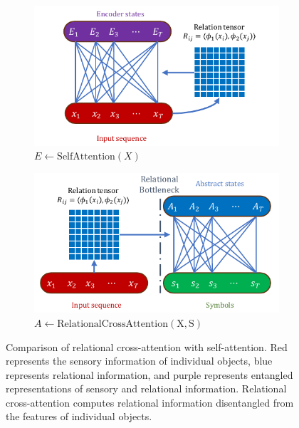 \begin{figure}
    \begin{subfigure}[b]{0.5\textwidth}
        \centering
        \includegraphics[width=\textwidth]{figures/self_attn_fig.pdf}
        \caption{$E \gets \mathrm{SelfAttention}(X)$}
        \label{fig:self_attention}
    \end{subfigure}
    \hfill
    \begin{subfigure}[b]{0.5\textwidth}
        \centering
        \includegraphics[width=\textwidth]{figures/rel_crossattn_fig.pdf}
        \caption{$A \gets \mathrm{RelationalCrossAttention(X, S)}$}
        \label{fig:relational_cross_attention}
    \end{subfigure}
    \caption{Comparison of relational cross-attention with self-attention. Red represents the sensory information of individual objects, blue represents relational information, and purple represents entangled representations of sensory and relational information. Relational cross-attention computes relational information disentangled from the features of individual objects.}
    \label{fig:attn_mechanisms}
\end{figure}

